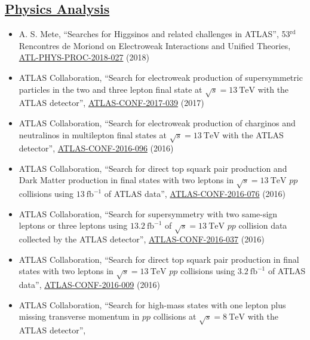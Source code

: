 \documentclass[a4paper,10pt]{article}
\begin{document}
\subsection{\underline{Physics Analysis}}
\vspace{1mm}
\begin{itemize}
	\item A. S. Mete,
	``Searches for Higgsinos and related challenges in ATLAS'',
	53$^{\mathrm{rd}}$ Rencontres de Moriond on Electroweak Interactions and Unified Theories,
	\href{https://cds.cern.ch/record/1478973}{ATL-PHYS-PROC-2018-027} (2018)
	\item ATLAS Collaboration,
	``Search for electroweak production of supersymmetric particles in the two and three lepton final state at $\sqrt{s}=13\ \mathrm{TeV}$ with the ATLAS detector'',
	\href{https://atlas.web.cern.ch/Atlas/GROUPS/PHYSICS/CONFNOTES/ATLAS-CONF-2017-039/}{ATLAS-CONF-2017-039} (2017)
	\item ATLAS Collaboration,
	``Search for electroweak production of charginos and neutralinos in multilepton final states at $\sqrt{s}=13\ \mathrm{TeV}$ with the ATLAS detector'',
	\href{https://atlas.web.cern.ch/Atlas/GROUPS/PHYSICS/CONFNOTES/ATLAS-CONF-2016-096/}{ATLAS-CONF-2016-096} (2016)
	\item ATLAS Collaboration, 
	``Search for direct top squark pair production and Dark Matter production in final states with two leptons in $\sqrt{s}=13\ \mathrm{TeV}$ $pp$ collisions using $13\ \mathrm{fb}^{-1}$ of ATLAS data'',
	\href{https://atlas.web.cern.ch/Atlas/GROUPS/PHYSICS/CONFNOTES/ATLAS-CONF-2016-076/}{ATLAS-CONF-2016-076} (2016)
	\item ATLAS Collaboration,
	``Search for supersymmetry with two same-sign leptons or three leptons using $13.2\ \mathrm{fb}^{-1}$ of $\sqrt{s}=13\ \mathrm{TeV}$ $pp$ collision data collected by the ATLAS detector'',
	\href{https://atlas.web.cern.ch/Atlas/GROUPS/PHYSICS/CONFNOTES/ATLAS-CONF-2016-037/}{ATLAS-CONF-2016-037} (2016)
	\item ATLAS Collaboration, 
	``Search for direct top squark pair production in final states with two leptons in $\sqrt{s}=13\ \mathrm{TeV}$ $pp$ collisions using $3.2\ \mathrm{fb}^{-1}$ of ATLAS data'',
	\href{https://atlas.web.cern.ch/Atlas/GROUPS/PHYSICS/CONFNOTES/ATLAS-CONF-2016-009/}{ATLAS-CONF-2016-009} (2016)	
	\item ATLAS Collaboration, 
	``Search for high-mass states with one lepton plus missing transverse momentum in $pp$ collisions at $\sqrt{s}= 8\ \mathrm{TeV}$ with the ATLAS detector'',

\end{itemize}
\end{document}
